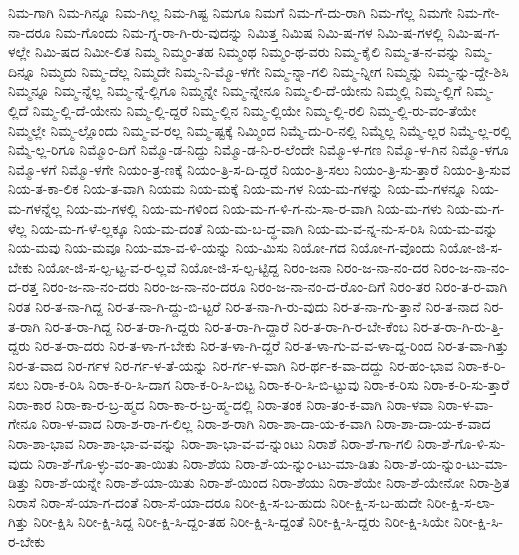 {ನಿಮ-ಗಾಗಿ
ನಿಮ-ಗಿನ್ನೂ
ನಿಮ-ಗಿಲ್ಲ
ನಿಮ-ಗಿಷ್ಟ
ನಿಮಗೂ
ನಿಮಗೆ
ನಿಮ-ಗೆ-ದು-ರಾಗಿ
ನಿಮ-ಗೆಲ್ಲ
ನಿಮಗೇ
ನಿಮ-ಗೇ-ನಾ-ದರೂ
ನಿಮ-ಗೊಂದು
ನಿಮ-ಗ್ನ-ರಾ-ಗಿ-ರು-ವುದನ್ನು
ನಿಮಿತ್ತ
ನಿಮಿಷ
ನಿಮಿ-ಷ-ಗಳ
ನಿಮಿ-ಷ-ಗಳಲ್ಲಿ
ನಿಮಿ-ಷ-ಗ-ಳಲ್ಲೇ
ನಿಮಿ-ಷದ
ನಿಮೀ-ಲಿತ
ನಿಮ್ಮ
ನಿಮ್ಮಂ-ತಹ
ನಿಮ್ಮಂಥ
ನಿಮ್ಮಂ-ಥ-ವರು
ನಿಮ್ಮ-ಕೈಲಿ
ನಿಮ್ಮ-ತ-ನ-ವನ್ನು
ನಿಮ್ಮ-ದಿನ್ನೂ
ನಿಮ್ಮದು
ನಿಮ್ಮ-ದೆಲ್ಲ
ನಿಮ್ಮದೇ
ನಿಮ್ಮ-ನಿ-ಮ್ಮೊ-ಳಗೇ
ನಿಮ್ಮ-ನ್ನಾ-ಗಲಿ
ನಿಮ್ಮ-ನ್ನೀಗ
ನಿಮ್ಮನ್ನು
ನಿಮ್ಮ-ನ್ನು-ದ್ದೇ-ಶಿಸಿ
ನಿಮ್ಮನ್ನೂ
ನಿಮ್ಮ-ನ್ನೆಲ್ಲ
ನಿಮ್ಮ-ನ್ನೆ-ಲ್ಲಿಗೂ
ನಿಮ್ಮನ್ನೇ
ನಿಮ್ಮ-ನ್ನೇನೂ
ನಿಮ್ಮ-ಲಿ-ದೆ-ಯೇನು
ನಿಮ್ಮಲ್ಲಿ
ನಿಮ್ಮ-ಲ್ಲಿಗೆ
ನಿಮ್ಮ-ಲ್ಲಿದೆ
ನಿಮ್ಮ-ಲ್ಲಿ-ದೆ-ಯೇನು
ನಿಮ್ಮ-ಲ್ಲಿ-ದ್ದರೆ
ನಿಮ್ಮ-ಲ್ಲಿನ
ನಿಮ್ಮ-ಲ್ಲಿಯೇ
ನಿಮ್ಮ-ಲ್ಲಿ-ರಲಿ
ನಿಮ್ಮ-ಲ್ಲಿ-ರು-ವಂ-ತೆಯೇ
ನಿಮ್ಮಲ್ಲೇ
ನಿಮ್ಮ-ಲ್ಲೊಂದು
ನಿಮ್ಮ-ವ-ರಲ್ಲ
ನಿಮ್ಮ-ಷ್ಟಕ್ಕೆ
ನಿಮ್ಮಿಂದ
ನಿಮ್ಮೆ-ದು-ರಿ-ನಲ್ಲಿ
ನಿಮ್ಮೆಲ್ಲ
ನಿಮ್ಮೆ-ಲ್ಲರ
ನಿಮ್ಮೆ-ಲ್ಲ-ರಲ್ಲಿ
ನಿಮ್ಮೆ-ಲ್ಲ-ರಿಗೂ
ನಿಮ್ಮೊಂ-ದಿಗೆ
ನಿಮ್ಮೊ-ಡ-ನಿದ್ದು
ನಿಮ್ಮೊ-ಡ-ನಿ-ರ-ಲೆಂದೇ
ನಿಮ್ಮೊ-ಳ-ಗಣ
ನಿಮ್ಮೊ-ಳ-ಗಿನ
ನಿಮ್ಮೊ-ಳಗೂ
ನಿಮ್ಮೊ-ಳಗೆ
ನಿಮ್ಮೊ-ಳಗೇ
ನಿಯಂ-ತ್ರ-ಣಕ್ಕೆ
ನಿಯಂ-ತ್ರಿ-ಸ-ದಿ-ದ್ದರೆ
ನಿಯಂ-ತ್ರಿ-ಸಲು
ನಿಯಂ-ತ್ರಿ-ಸು-ತ್ತಾರೆ
ನಿಯಂ-ತ್ರಿ-ಸುವ
ನಿಯ-ತ-ಕಾ-ಲಿಕ
ನಿಯ-ತ-ವಾಗಿ
ನಿಯಮ
ನಿಯ-ಮಕ್ಕೆ
ನಿಯ-ಮ-ಗಳ
ನಿಯ-ಮ-ಗಳನ್ನು
ನಿಯ-ಮ-ಗಳನ್ನೂ
ನಿಯ-ಮ-ಗಳನ್ನೆಲ್ಲ
ನಿಯ-ಮ-ಗಳಲ್ಲಿ
ನಿಯ-ಮ-ಗಳಿಂದ
ನಿಯ-ಮ-ಗ-ಳಿ-ಗ-ನು-ಸಾ-ರ-ವಾಗಿ
ನಿಯ-ಮ-ಗಳು
ನಿಯ-ಮ-ಗ-ಳೆಲ್ಲ
ನಿಯ-ಮ-ಗ-ಳೆ-ಲ್ಲಕ್ಕೂ
ನಿಯ-ಮ-ದಂತೆ
ನಿಯ-ಮ-ಬ-ದ್ಧ-ವಾಗಿ
ನಿಯ-ಮ-ವ-ನ್ನ-ನು-ಸ-ರಿಸಿ
ನಿಯ-ಮ-ವನ್ನು
ನಿಯ-ಮವು
ನಿಯ-ಮವೂ
ನಿಯ-ಮಾ-ವ-ಳಿ-ಯನ್ನು
ನಿಯ-ಮಿಸು
ನಿಯೋ-ಗದ
ನಿಯೋ-ಗ-ವೊಂದು
ನಿಯೋ-ಜಿ-ಸ-ಬೇಕು
ನಿಯೋ-ಜಿ-ಸ-ಲ್ಪ-ಟ್ಟ-ವ-ರ-ಲ್ಲವೆ
ನಿಯೋ-ಜಿ-ಸ-ಲ್ಪ-ಟ್ಟಿದ್ದ
ನಿರಂ-ಜನಾ
ನಿರಂ-ಜ-ನಾ-ನಂ-ದರ
ನಿರಂ-ಜ-ನಾ-ನಂ-ದ-ರತ್ತ
ನಿರಂ-ಜ-ನಾ-ನಂ-ದರು
ನಿರಂ-ಜ-ನಾ-ನಂ-ದರೂ
ನಿರಂ-ಜ-ನಾ-ನಂ-ದ-ರೊಂ-ದಿಗೆ
ನಿರಂ-ತರ
ನಿರಂ-ತ-ರ-ವಾಗಿ
ನಿರತ
ನಿರ-ತ-ನಾ-ಗಿದ್ದ
ನಿರ-ತ-ನಾ-ಗಿ-ದ್ದು-ಬಿ-ಟ್ಟರೆ
ನಿರ-ತ-ನಾ-ಗಿ-ರು-ವುದು
ನಿರ-ತ-ನಾ-ಗು-ತ್ತಾನೆ
ನಿರ-ತ-ನಾದ
ನಿರ-ತ-ರಾಗಿ
ನಿರ-ತ-ರಾ-ಗಿದ್ದ
ನಿರ-ತ-ರಾ-ಗಿ-ದ್ದರು
ನಿರ-ತ-ರಾ-ಗಿ-ದ್ದಾರೆ
ನಿರ-ತ-ರಾ-ಗಿ-ರ-ಬೇ-ಕೆಂಬ
ನಿರ-ತ-ರಾ-ಗಿ-ರು-ತ್ತಿ-ದ್ದರು
ನಿರ-ತ-ರಾ-ದರು
ನಿರ-ತ-ಳಾ-ಗ-ಬೇಕು
ನಿರ-ತ-ಳಾ-ಗಿ-ದ್ದರೆ
ನಿರ-ತ-ಳಾ-ಗು-ವ-ವ-ಳಾ-ದ್ದ-ರಿಂದ
ನಿರ-ತ-ವಾ-ಗಿತ್ತು
ನಿರ-ತ-ವಾದ
ನಿರ-ರ್ಗಳ
ನಿರ-ರ್ಗ-ಳ-ತೆ-ಯನ್ನು
ನಿರ-ರ್ಗ-ಳ-ವಾಗಿ
ನಿರ-ರ್ಥ-ಕ-ವಾ-ದದ್ದು
ನಿರ-ಹಂ-ಭಾವ
ನಿರಾ-ಕ-ರಿ-ಸಲು
ನಿರಾ-ಕ-ರಿಸಿ
ನಿರಾ-ಕ-ರಿ-ಸಿ-ದಾಗ
ನಿರಾ-ಕ-ರಿ-ಸಿ-ಬಿಟ್ಟ
ನಿರಾ-ಕ-ರಿ-ಸಿ-ಬಿ-ಟ್ಟುವು
ನಿರಾ-ಕ-ರಿಸು
ನಿರಾ-ಕ-ರಿ-ಸು-ತ್ತಾರೆ
ನಿರಾ-ಕಾರ
ನಿರಾ-ಕಾ-ರ-ಬ್ರ-ಹ್ಮದ
ನಿರಾ-ಕಾ-ರ-ಬ್ರ-ಹ್ಮ-ದಲ್ಲಿ
ನಿರಾ-ತಂಕ
ನಿರಾ-ತಂ-ಕ-ವಾಗಿ
ನಿರಾ-ಳವಾ
ನಿರಾ-ಳ-ವಾ-ಗೇನೂ
ನಿರಾ-ಳ-ವಾದ
ನಿರಾ-ಶ-ರಾ-ಗ-ಲಿಲ್ಲ
ನಿರಾ-ಶ-ರಾಗಿ
ನಿರಾ-ಶಾ-ದಾ-ಯ-ಕ-ವಾಗಿ
ನಿರಾ-ಶಾ-ದಾ-ಯ-ಕ-ವಾದ
ನಿರಾ-ಶಾ-ಭಾವ
ನಿರಾ-ಶಾ-ಭಾ-ವ-ವನ್ನು
ನಿರಾ-ಶಾ-ಭಾ-ವ-ವ-ನ್ನುಂಟು
ನಿರಾಶೆ
ನಿರಾ-ಶೆ-ಗಾ-ಗಲಿ
ನಿರಾ-ಶೆ-ಗೊ-ಳಿ-ಸು-ವುದು
ನಿರಾ-ಶೆ-ಗೊ-ಳ್ಳು-ವಂ-ತಾ-ಯಿತು
ನಿರಾ-ಶೆಯ
ನಿರಾ-ಶೆ-ಯ-ನ್ನುಂ-ಟು-ಮಾ-ಡಿತು
ನಿರಾ-ಶೆ-ಯ-ನ್ನುಂ-ಟು-ಮಾ-ಡಿತ್ತು
ನಿರಾ-ಶೆ-ಯನ್ನೇ
ನಿರಾ-ಶೆ-ಯಾ-ಯಿತು
ನಿರಾ-ಶೆ-ಯಿಂದ
ನಿರಾ-ಶೆಯು
ನಿರಾ-ಶೆಯೇ
ನಿರಾ-ಶೆ-ಯೇನೋ
ನಿರಾ-ಶ್ರಿತ
ನಿರಾಸೆ
ನಿರಾ-ಸೆ-ಯಾ-ಗ-ದಂತೆ
ನಿರಾ-ಸೆ-ಯಾ-ದರೂ
ನಿರೀ-ಕ್ಷಿ-ಸ-ಬ-ಹುದು
ನಿರೀ-ಕ್ಷಿ-ಸ-ಬ-ಹುದೇ
ನಿರೀ-ಕ್ಷಿ-ಸ-ಲಾ-ಗಿತ್ತು
ನಿರೀ-ಕ್ಷಿಸಿ
ನಿರೀ-ಕ್ಷಿ-ಸಿದ್ದ
ನಿರೀ-ಕ್ಷಿ-ಸಿ-ದ್ದಂ-ತಹ
ನಿರೀ-ಕ್ಷಿ-ಸಿ-ದ್ದಂತೆ
ನಿರೀ-ಕ್ಷಿ-ಸಿ-ದ್ದರು
ನಿರೀ-ಕ್ಷಿ-ಸಿಯೇ
ನಿರೀ-ಕ್ಷಿ-ಸಿ-ರ-ಬೇಕು
}
